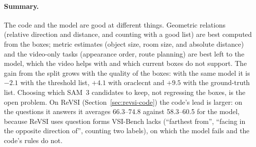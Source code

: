 \paragraph{Summary.}
The code and the model are good at different things. Geometric relations (relative direction and distance, and counting
with a good list) are best computed from the boxes; metric estimates (object size, room size, and absolute distance) and
the video-only tasks (appearance order, route planning) are best left to the model, which the video helps with and
which current boxes do not support. The gain from the split grows with the quality of the boxes: with the same model it
is $-2.1$ with the threshold list, $+4.1$ with oraclecnt and $+9.5$ with the ground-truth list. Choosing which SAM~3
candidates to keep, not regressing the boxes, is the open problem. On ReVSI (Section~\ref{sec:revsi-code}) the code's
lead is larger: on the questions it answers it averages 66.3--74.8 against 58.3--60.5 for the model, because ReVSI uses
question forms VSI-Bench lacks (``farthest from'', ``facing in the opposite direction of'', counting two labels), on which
the model fails and the code's rules do not.
